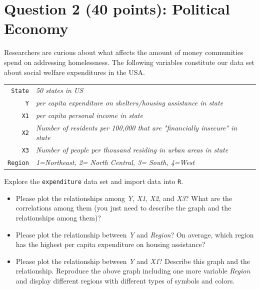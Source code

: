\documentclass[12pt,letterpaper]{article}
\begin{document}
\newpage

	\section*{Question 2 (40 points): Political Economy}

\noindent Researchers are curious about what affects the amount of money communities spend on addressing homelessness. The following variables constitute our data set about social welfare expenditures in the USA. \\
\vspace{.5cm}


\begin{tabular}{r|l}
	\texttt{State} &\emph{50 states in US} \\
	\texttt{Y} & \emph{per capita expenditure on shelters/housing assistance in state}\\
	\texttt{X1} &\emph{per capita personal income in state} \\
	\texttt{X2} &  \emph{Number of residents per 100,000 that are "financially insecure" in state}\\
	\texttt{X3} &  \emph{Number of people per thousand residing in urban areas in state} \\
	\texttt{Region} &  \emph{1=Northeast, 2= North Central, 3= South, 4=West} \\
\end{tabular}

\vspace{.5cm}
\noindent Explore the \texttt{expenditure} data set and import data into \texttt{R}.
\vspace{.5cm}
  
\vspace{.5cm}
\begin{itemize}

\item
Please plot the relationships among \emph{Y}, \emph{X1}, \emph{X2}, and \emph{X3}? What are the correlations among them (you just need to describe the graph and the relationships among them)?
\vspace{.5cm}
\item
Please plot the relationship between \emph{Y} and \emph{Region}? On average, which region has the highest per capita expenditure on housing assistance?
\vspace{.5cm}
\item
Please plot the relationship between \emph{Y} and \emph{X1}? Describe this graph and the relationship. Reproduce the above graph including one more variable \emph{Region} and display different regions with different types of symbols and colors.
\end{itemize}
\end{document}
